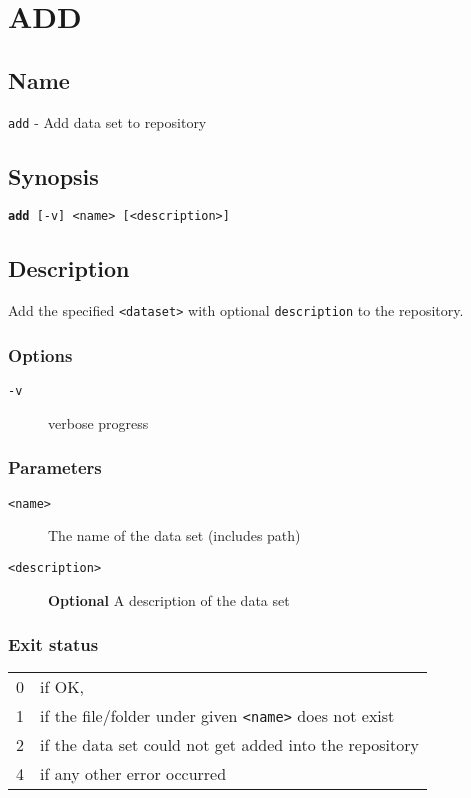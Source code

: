 \documentclass{article} %
\begin{document}
		\section*{ADD}
		\subsection*{Name}
		\texttt{add} - Add data set to repository
		\subsection*{Synopsis}
		\texttt{\textbf{add} [-v] <name> [<description>]}
		\subsection*{Description}
		Add the specified \texttt{<dataset>} with optional \texttt{description} to the repository.\\
		
		\noindent
		\subsubsection*{Options}
		\begin{description}
			\item[\texttt{-v}] verbose progress
		\end{description}
		
		\subsubsection*{Parameters}
		\begin{description}
			\item[\texttt{<name>}] The name of the data set (includes path)
			\item[\texttt{<description>}] \textbf{Optional} A description of the data set
		\end{description}
		\subsubsection*{Exit status}
		\begin{tabular}{ll}
			0 &  if OK,\\ 
			1 &  if the file/folder under given \texttt{<name>} does not exist\\ 
			2 &  if the data set could not get added into the repository\\
			4 &  if any other error occurred\\
		\end{tabular}
\end{document}
